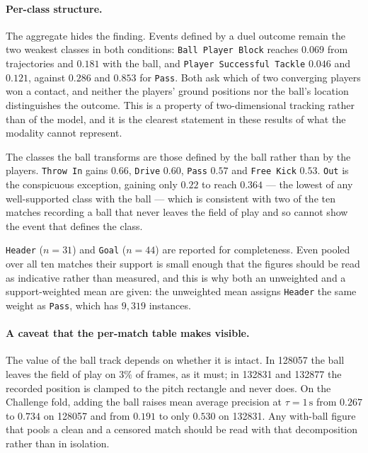 \paragraph{Per-class structure.}
The aggregate hides the finding. Events defined by a duel outcome remain the two weakest
classes in both conditions: \texttt{Ball Player Block} reaches $0.069$ from trajectories and
$0.181$ with the ball, and \texttt{Player Successful Tackle} $0.046$ and $0.121$, against
$0.286$ and $0.853$ for \texttt{Pass}. Both ask which of two converging players won a contact,
and neither the players' ground positions nor the ball's location distinguishes the outcome.
This is a property of two-dimensional tracking rather than of the model, and it is the
clearest statement in these results of what the modality cannot represent.

The classes the ball transforms are those defined by the ball rather than by the players.
\texttt{Throw In} gains $0.66$, \texttt{Drive} $0.60$, \texttt{Pass} $0.57$ and
\texttt{Free Kick} $0.53$. \texttt{Out} is the conspicuous exception, gaining only $0.22$ to
reach $0.364$ --- the lowest of any well-supported class with the ball --- which is consistent
with two of the ten matches recording a ball that never leaves the field of play and so cannot
show the event that defines the class.

\texttt{Header} ($n = 31$) and \texttt{Goal} ($n = 44$) are reported for completeness. Even
pooled over all ten matches their support is small enough that the figures should be read as
indicative rather than measured, and this is why both an unweighted and a support-weighted
mean are given: the unweighted mean assigns \texttt{Header} the same weight as \texttt{Pass},
which has $9{,}319$ instances.

\paragraph{A caveat that the per-match table makes visible.}
The value of the ball track depends on whether it is intact. In 128057 the ball leaves the
field of play on $3\%$ of frames, as it must; in 132831 and 132877 the recorded position is
clamped to the pitch rectangle and never does. On the Challenge fold, adding the ball raises
mean average precision at $\tau = 1\,\text{s}$ from $0.267$ to $0.734$ on 128057 and from
$0.191$ to only $0.530$ on 132831. Any with-ball figure that pools a clean and a censored
match should be read with that decomposition rather than in isolation.
